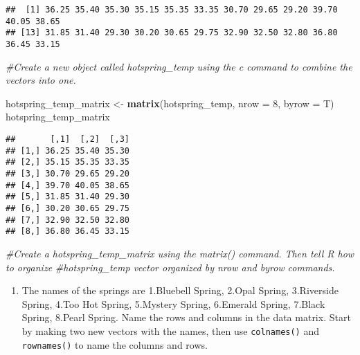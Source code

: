 \documentclass[
]{article}
\newenvironment{Shaded}{\begin{snugshade}}{\end{snugshade}}
\newcommand{\AttributeTok}[1]{\textcolor[rgb]{0.13,0.29,0.53}{#1}}
\newcommand{\CommentTok}[1]{\textcolor[rgb]{0.56,0.35,0.01}{\textit{#1}}}
\newcommand{\DecValTok}[1]{\textcolor[rgb]{0.00,0.00,0.81}{#1}}
\newcommand{\FunctionTok}[1]{\textcolor[rgb]{0.13,0.29,0.53}{\textbf{#1}}}
\newcommand{\NormalTok}[1]{#1}
\newcommand{\OtherTok}[1]{\textcolor[rgb]{0.56,0.35,0.01}{#1}}
\providecommand{\tightlist}{%
  \setlength{\itemsep}{0pt}\setlength{\parskip}{0pt}}
\begin{document}
\begin{verbatim}
##  [1] 36.25 35.40 35.30 35.15 35.35 33.35 30.70 29.65 29.20 39.70 40.05 38.65
## [13] 31.85 31.40 29.30 30.20 30.65 29.75 32.90 32.50 32.80 36.80 36.45 33.15
\end{verbatim}

\begin{Shaded}
\begin{Highlighting}[]
\CommentTok{\#Create a new object called \textquotesingle{}hotspring\_temp\textquotesingle{} using the \textasciigrave{}c\textasciigrave{} command to combine the vectors into one.}
\end{Highlighting}
\end{Shaded}

\begin{Shaded}
\begin{Highlighting}[]
\NormalTok{hotspring\_temp\_matrix }\OtherTok{\textless{}{-}} \FunctionTok{matrix}\NormalTok{(hotspring\_temp, }\AttributeTok{nrow =} \DecValTok{8}\NormalTok{, }\AttributeTok{byrow =}\NormalTok{ T)}
\NormalTok{hotspring\_temp\_matrix}
\end{Highlighting}
\end{Shaded}

\begin{verbatim}
##       [,1]  [,2]  [,3]
## [1,] 36.25 35.40 35.30
## [2,] 35.15 35.35 33.35
## [3,] 30.70 29.65 29.20
## [4,] 39.70 40.05 38.65
## [5,] 31.85 31.40 29.30
## [6,] 30.20 30.65 29.75
## [7,] 32.90 32.50 32.80
## [8,] 36.80 36.45 33.15
\end{verbatim}

\begin{Shaded}
\begin{Highlighting}[]
\CommentTok{\#Create a \textquotesingle{}hotspring\_temp\_matrix\textquotesingle{} using the \textquotesingle{}matrix()\textquotesingle{} command. Then tell R how to organize}
\CommentTok{\#\textquotesingle{}hotspring\_temp\textquotesingle{} vector organized by nrow and byrow commands. }
\end{Highlighting}
\end{Shaded}

\begin{enumerate}
\def\labelenumi{\arabic{enumi}.}
\setcounter{enumi}{4}
\tightlist
\item
  The names of the springs are 1.Bluebell Spring, 2.Opal Spring,
  3.Riverside Spring, 4.Too Hot Spring, 5.Mystery Spring, 6.Emerald
  Spring, 7.Black Spring, 8.Pearl Spring. Name the rows and columns in
  the data matrix. Start by making two new vectors with the names, then
  use \texttt{colnames()} and \texttt{rownames()} to name the columns
  and rows.
\end{enumerate}
\end{document}

